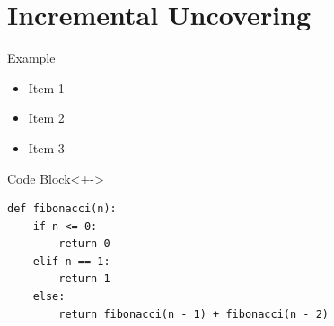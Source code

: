 \documentclass{beamer}
\begin{document}

\section{Incremental Uncovering}


\begin{frame}[fragile]{Example}
\begin{itemize}[<+->]
\item Item 1
\item Item 2
\item Item 3
\end{itemize}
\begin{block}{Code Block}<+->
\begin{verbatim}
def fibonacci(n):
    if n <= 0:
        return 0
    elif n == 1:
        return 1
    else:
        return fibonacci(n - 1) + fibonacci(n - 2)
\end{verbatim}
\end{block}
\end{frame}


\backmatter
\end{document}
